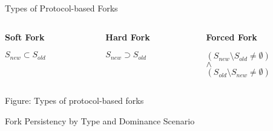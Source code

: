 \documentclass[handout]{beamer}
\begin{document}
\begin{frame}{Types of Protocol-based Forks}


\begin{columns}[T]
	\begin{column}{0.3\textwidth}
		\center		
		\textbf{Soft Fork}\\
		\vspace{0.5em}
		\begin{figure}[h]
  			\resizebox{0.9\textwidth}{!}{
			
			}
		\end{figure}
		\vspace{1em}
		$S_{new}\subset S_{old}$
	\end{column}
	\begin{column}{0.3\textwidth}
		\center
 		\textbf{Hard Fork}\\
 		\vspace{1em}
 		\begin{figure}[h]
  			\center
  			\resizebox{0.9\textwidth}{!}{
			
			}
		\end{figure}
 		\vspace{1.5em}
 		$S_{new}\supset S_{old}$
	\end{column}
		\begin{column}{0.3\textwidth}
		\center
 		\textbf{Forced Fork}\\
 		\vspace{0.5em}
 		\begin{figure}[h]
  			\center
  			\resizebox{0.9\textwidth}{!}{
			
			}
		\end{figure}
		\vspace{0.8em}
 		$(S_{new}\setminus S_{old} \neq \emptyset)$\\$\wedge$\\ $(S_{old}\setminus S_{new} \neq \emptyset)$
	\end{column}
\end{columns}

\vspace{0.5em}

\begin{center}
	Figure: Types of protocol-based forks \cite{schar2020blockchain}
\end{center}

	
\end{frame}

\begin{frame}{Fork Persistency by Type and Dominance Scenario}

	\begin{table}
		
		\caption{Persistency by fork type and scenario \cite{schar2020blockchain}}
		\label{tbl:forkpersistencies}
	\end{table}
	
\end{frame}
\end{document}

